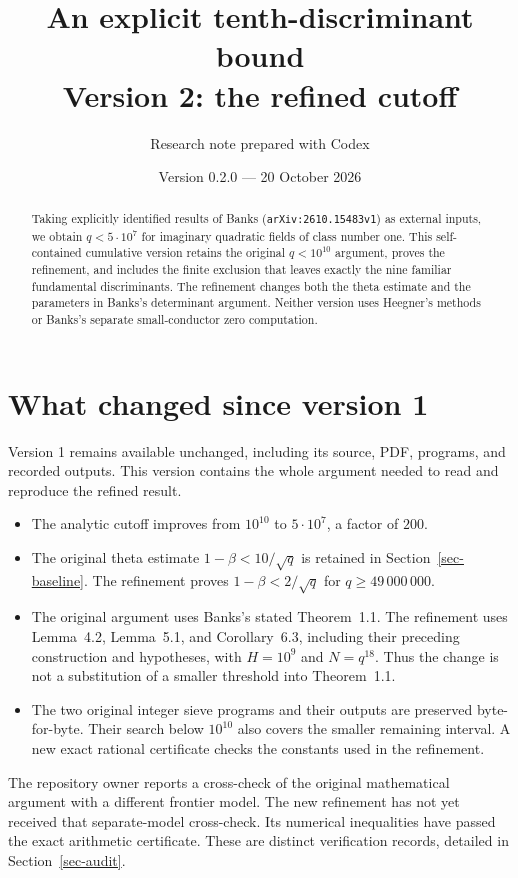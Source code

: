 \documentclass[11pt]{article}
\title{An explicit tenth-discriminant bound\\Version 2: the refined cutoff}
\author{Research note prepared with Codex}
\date{Version 0.2.0 --- 20 October 2026}
\begin{document}
\maketitle
\begin{abstract}
Taking explicitly identified results of Banks
(\texttt{arXiv:2610.15483v1}) as external inputs, we obtain
\(q<5\cdot10^7\) for imaginary quadratic fields of class number one.
This self-contained cumulative version retains the original
\(q<10^{10}\) argument, proves the refinement, and includes the finite
exclusion that leaves exactly the nine familiar fundamental discriminants.
The refinement changes both the theta estimate and the parameters in
Banks's determinant argument. Neither version uses Heegner's methods
or Banks's separate small-conductor zero computation.
\end{abstract}

\section{What changed since version 1}\label{sec-changes}

Version 1 remains available unchanged, including its source, PDF,
programs, and recorded outputs. This version contains the whole argument
needed to read and reproduce the refined result.
\begin{itemize}
\item The analytic cutoff improves from \(10^{10}\) to
\(5\cdot10^7\), a factor of \(200\).
\item The original theta estimate \(1-\beta<10/\sqrt q\) is retained
in Section~\ref{sec-baseline}. The refinement proves
\(1-\beta<2/\sqrt q\) for \(q\ge49\,000\,000\).
\item The original argument uses Banks's stated Theorem~1.1. The
refinement uses Lemma~4.2, Lemma~5.1, and Corollary~6.3, including their
preceding construction and hypotheses, with \(H=10^9\) and \(N=q^{18}\).
Thus the change is not a substitution of a smaller threshold into
Theorem~1.1.
\item The two original integer sieve programs and their outputs are
preserved byte-for-byte. Their search below \(10^{10}\) also covers
the smaller remaining interval. A new exact rational certificate
checks the constants used in the refinement.
\end{itemize}

The repository owner reports a cross-check of the original mathematical
argument with a different frontier model. The new refinement has not
yet received that separate-model cross-check. Its numerical inequalities
have passed the exact arithmetic certificate. These are distinct
verification records, detailed in Section~\ref{sec-audit}.
\end{document}
